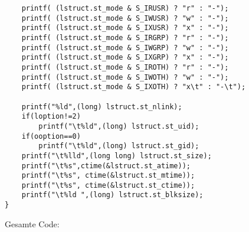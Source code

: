 \begin{itemize}
\begin{lstlisting}
	printf( (lstruct.st_mode & S_IRUSR) ? "r" : "-");
	printf( (lstruct.st_mode & S_IWUSR) ? "w" : "-");
	printf( (lstruct.st_mode & S_IXUSR) ? "x" : "-");
	printf( (lstruct.st_mode & S_IRGRP) ? "r" : "-");
	printf( (lstruct.st_mode & S_IWGRP) ? "w" : "-");
	printf( (lstruct.st_mode & S_IXGRP) ? "x" : "-");
	printf( (lstruct.st_mode & S_IROTH) ? "r" : "-");
	printf( (lstruct.st_mode & S_IWOTH) ? "w" : "-");
	printf( (lstruct.st_mode & S_IXOTH) ? "x\t" : "-\t");

	printf("%ld",(long) lstruct.st_nlink);
	if(loption!=2)
		printf("\t%ld",(long) lstruct.st_uid);
	if(ooption==0)
		printf("\t%ld",(long) lstruct.st_gid);
	printf("\t%lld",(long long) lstruct.st_size);
	printf("\t%s",ctime(&lstruct.st_atime));
	printf("\t%s", ctime(&lstruct.st_mtime));
	printf("\t%s", ctime(&lstruct.st_ctime));
	printf("\t%ld ",(long) lstruct.st_blksize);
}
\end{lstlisting}

\end{itemize}
Gesamte Code:
